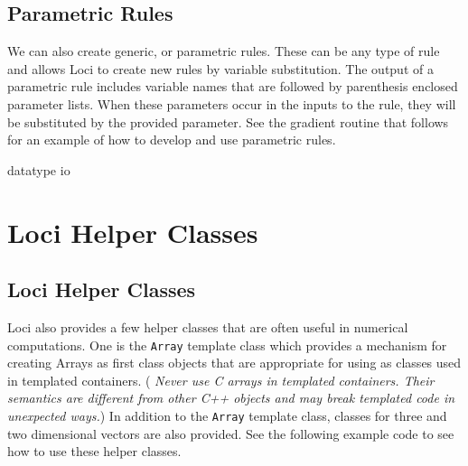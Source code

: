 \documentclass[10pt,epsf]{book}
\begin{document}


\section{Parametric Rules}

We can also create generic, or parametric rules.  These can be any
type of rule and allows Loci to create new rules by variable
substitution.  The output of a parametric rule includes variable names
that are followed by parenthesis enclosed parameter lists.  When these
parameters occur in the inputs to the rule, they will be substituted
by the provided parameter.  See the gradient routine that follows for
an example of how to develop and use parametric rules.




 {datatype}
 {io}

\chapter{Loci Helper Classes}
\section{Loci Helper Classes}

Loci also provides a few helper classes that are often useful in
numerical computations.  
One is the {\tt Array} template class which provides a
mechanism for creating Arrays as first class objects that are
appropriate for using as classes used in templated containers. ({\it
Never use C arrays in templated containers.  Their semantics are
different from other C++ objects and may break templated code in
unexpected ways.})  In addition to the {\tt Array} template class,
classes for three and two dimensional vectors are also provided.  See
the following example code to see how to use these helper classes.




\end{document}
